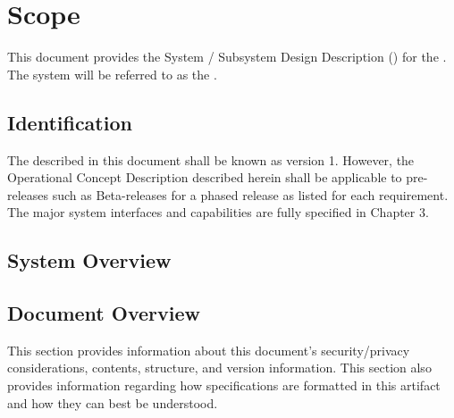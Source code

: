 
\chapter{Scope}
\label{loc:Scope}


This document provides the System / Subsystem Design Description (\SSDD) for the \ThisSystem. 
The system will be referred to as the \ThisSys.

\section{Identification}
\label{loc:Identification}


The \ThisSystem described in this document shall be known as \ThisSys version 1.
However, the Operational Concept Description {\OCD} described herein shall be applicable to pre-releases such as Beta-releases for a phased release as listed for each requirement.
The major system interfaces and capabilities are fully specified in Chapter 3.

\section{System Overview}
\label{loc:SystemOverview}




\newpage
\section{Document Overview}
\label{loc:DocumentOverview}


This section provides information about this document's security/privacy considerations, contents, structure, and version information.
This section also provides information regarding how specifications are formatted in this artifact and how they can best be understood.








